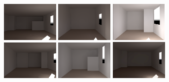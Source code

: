 \begin{figure}[t]
\includegraphics[width=1.1in]{../gi2012_userstudy/images/renderings/ground_truth/mrc331_camera_dark_march_crop.png} \hfill %
\includegraphics[width=1.1in]{../gi2012_userstudy/images/renderings/renovations/065_camera_dark_march_crop.png} \hfill %
\includegraphics[width=1.1in]{../gi2012_userstudy/images/renderings/renovations/031_camera_dark_march_crop.png} \hfill %
\includegraphics[width=1.1in]{../gi2012_userstudy/images/renderings/renovations/063_camera_dark_march_crop.png} \hfill    %
\includegraphics[width=1.1in]{../gi2012_userstudy/images/renderings/renovations/050_camera_dark_march_crop.png} \hfill    %
\includegraphics[width=1.11in]{images/renovations/PRE_N6_march_dark.png} \\


\end{figure}
